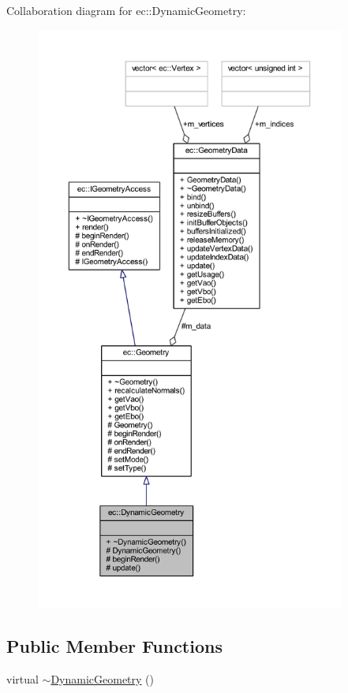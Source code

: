 Collaboration diagram for ec\+:\+:Dynamic\+Geometry\+:\nopagebreak
\begin{figure}[H]
\begin{center}
\leavevmode
\includegraphics[height=550pt]{classec_1_1_dynamic_geometry__coll__graph}
\end{center}
\end{figure}
\subsection*{Public Member Functions}
\begin{DoxyCompactItemize}
\item 
virtual \mbox{\hyperlink{classec_1_1_dynamic_geometry_aeed5b7ffd9876f086207dbaf7e5bc6fc}{$\sim$\+Dynamic\+Geometry}} ()
\end{DoxyCompactItemize}
